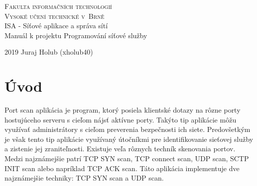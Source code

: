 \documentclass[a4paper, 11pt]{article}
\begin{document}
\begin{titlepage}
	\begin{center}
		\Huge
		\textsc{Fakulta informačních technologií \\
			Vysoké učení technické v~Brně} \\
		{\LARGE
			ISA - Síťové aplikace a správa sítí \\ 
			\medskip \Large{Manuál k projektu 
				Programování síťové služby}
			}
	\end{center}
		\setlength{\parindent}{0.3em}
		{\Large 2019 \hfill
			Juraj Holub (xholub40)}
\end{titlepage}

\tableofcontents
\newpage

\section{Úvod}
Port scan aplikácia je program, ktorý posiela klientské dotazy na rôzne porty hostujúceho serveru s cieľom nájsť aktívne porty. Takýto tip aplikácie môžu využívať administrátory s cieľom preverenia bezpečnosti ich siete. Predovšetkým je však tento tip aplikácie využívaný útočníkmi pre identifikovanie sieťovej služby a zistenie jej zraniteľnosti. Existuje veľa rôznych techník skenovania portov. Medzi najznámejšie patrí TCP SYN scan, TCP connect scan, UDP scan, SCTP INIT scan alebo napríklad TCP ACK scan. Táto aplikácia implementuje dve najznámejšie techniky: TCP SYN scan a UDP scan.
\cite{rfc_2828}
\end{document}
